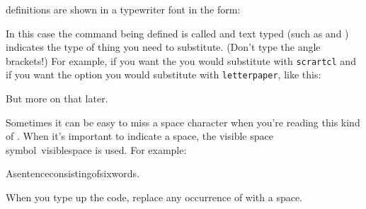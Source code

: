  definitions are shown in a typewriter font in the form:
\begin{definition}
\end{definition}%
In this case the command being defined is called
 and text typed  (such as
 and ) indicates the type of thing you
need to substitute. (Don't type the angle brackets!) For example, if you want the 
 you would substitute  with
\texttt{scrartcl} and if you want the  option you
would substitute  with \texttt{letterpaper}, like this:
\begin{codeS}
\end{codeS}
But more on that later.

\label{obj:visiblespace}%
Sometimes it can be easy to miss a space character when you're
reading this kind of . When it's important
to indicate a space, the visible space symbol~\gls{visiblespace} is used. For
example:
\begin{codeS}
Asentenceconsistingofsixwords.
\end{codeS}
When you type up the code, replace any occurrence of
 with a space.

